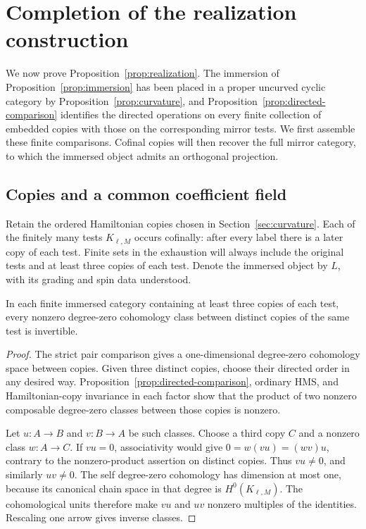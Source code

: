 \section{Completion of the realization construction}
\label{sec:realization}

We now prove Proposition~\ref{prop:realization}.  The immersion of
Proposition~\ref{prop:immersion} has been placed in a proper uncurved
cyclic category by Proposition~\ref{prop:curvature}, and
Proposition~\ref{prop:directed-comparison}
identifies the directed operations on every finite collection of
embedded copies with those on the corresponding mirror tests.
We first assemble these finite comparisons.  Cofinal copies will then
recover the full mirror category, to which the immersed object admits
an orthogonal projection.

\subsection{Copies and a common coefficient field}

Retain the ordered Hamiltonian copies chosen in
Section~\ref{sec:curvature}.  Each of the finitely many tests
$K_{\ell,M}$ occurs cofinally: after every label there is a later copy
of each test.
Finite sets in the exhaustion will always include the original tests
and at least three copies of each test.  Denote
the immersed object by $L$, with its grading and spin data understood.

\begin{lemma}
\label{realization:copies}
In each finite immersed category containing at least three copies of
each test, every nonzero degree-zero cohomology class between distinct
copies of the same test is invertible.
\end{lemma}

\begin{proof}
The strict pair comparison gives a one-dimensional degree-zero
cohomology space between copies.  Given three distinct copies, choose
their directed order in any desired way.
Proposition~\ref{prop:directed-comparison}, ordinary HMS, and
Hamiltonian-copy invariance in each factor show that the product of two
nonzero composable degree-zero classes between those copies is nonzero.

Let $u:A\to B$ and $v:B\to A$ be such classes.  Choose a third copy $C$
and a nonzero class $w:A\to C$.  If $vu=0$, associativity would give
$0=w(vu)=(wv)u$, contrary to the nonzero-product assertion on distinct
copies.  Thus $vu\ne0$, and similarly $uv\ne0$.  The self degree-zero
cohomology has dimension at most one, because its canonical chain space
in that degree is $H^0(K_{\ell,M})$.  The cohomological units therefore
make $vu$ and $uv$ nonzero multiples of the identities.  Rescaling one
arrow gives inverse classes.
\end{proof}

